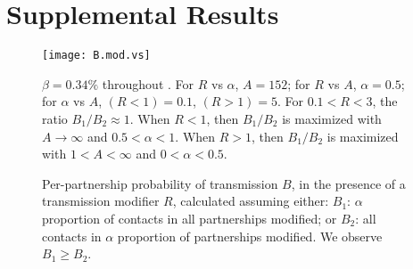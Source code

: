 \section{Supplemental Results}\label{sup}
\begin{figure}[h]
  \centerline{\texttt{[image: B.mod.vs]}}
  \caption{Per-partnership probability of transmission $B$,
    in the presence of a transmission modifier $R$, calculated assuming either:
    $B_1$: $\alpha$ proportion of contacts in all partnerships modified; or
    $B_2$: all contacts in $\alpha$ proportion of partnerships modified.
    We observe $B_1 \ge B_2$.}
  \label{fig:B.mod.sens}
  \floatfoot
  $\beta = 0.34\%$ throughout \cite{Boily2009}.
  For $R$ vs $\alpha$, $A = 152$;
  for $R$ vs $A$, $\alpha = 0.5$;
  for $\alpha$ vs $A$, $(R<1) = 0.1$, $(R>1) = 5$.
  For $0.1 < R < 3$, the ratio $B_1 / B_2 \approx 1$.
  When $R < 1$, then $B_1 / B_2$ is maximized with $A \rightarrow \infty$ and $0.5 < \alpha < 1$.
  When $R > 1$, then $B_1 / B_2$ is maximized with $1 < A < \infty$ and $0 < \alpha < 0.5$.
\end{figure}